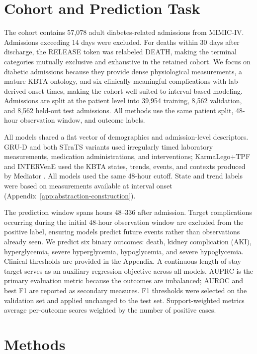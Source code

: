 \documentclass[letterpaper]{article} %
\begin{document}
\section{Cohort and Prediction Task}

The cohort contains 57,078 adult diabetes-related admissions from MIMIC-IV. Admissions exceeding 14 days were excluded. For deaths within 30 days after discharge, the RELEASE token was relabeled DEATH, making the terminal categories mutually exclusive and exhaustive in the retained cohort. We focus on diabetic admissions because they provide dense physiological measurements, a mature KBTA ontology, and six clinically meaningful complications with lab-derived onset times, making the cohort well suited to interval-based modeling. Admissions are split at the patient level into 39,954 training, 8,562 validation, and 8,562 held-out test admissions. All methods use the same patient split, 48-hour observation window, and outcome labels.

All models shared a flat vector of demographics and admission-level descriptors. GRU-D and both STraTS variants used irregularly timed laboratory measurements, medication administrations, and interventions; KarmaLego+TPF and INTERVenE used the KBTA states, trends, events, and contexts produced by Mediator \citep{shahar1997framework}. All models used the same 48-hour cutoff. State and trend labels were based on measurements available at interval onset (Appendix~\ref{app:abstraction-construction}).

The prediction window spans hours 48--336 after admission. Target complications occurring during the initial 48-hour observation window are excluded from the positive label, ensuring models predict future events rather than observations already seen. We predict six binary outcomes: death, kidney complication (AKI), hyperglycemia, severe hyperglycemia, hypoglycemia, and severe hypoglycemia. Clinical thresholds are provided in the Appendix. A continuous length-of-stay target serves as an auxiliary regression objective across all models. AUPRC is the primary evaluation metric because the outcomes are imbalanced; AUROC and best F1 are reported as secondary measures. F1 thresholds were selected on the validation set and applied unchanged to the test set. Support-weighted metrics average per-outcome scores weighted by the number of positive cases.

\section{Methods}
\end{document}
